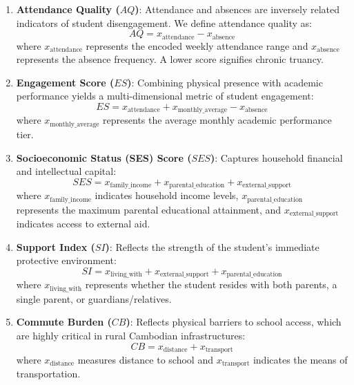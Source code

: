 \documentclass[12pt,journal,compsoc]{IEEEtran}
\begin{document}
\begin{enumerate}
    \item \textbf{Attendance Quality ($AQ$)}: Attendance and absences are inversely related indicators of student disengagement. We define attendance quality as:
    \begin{equation}
        AQ = x_{\text{attendance}} - x_{\text{absence}}
    \end{equation}
    where $x_{\text{attendance}}$ represents the encoded weekly attendance range and $x_{\text{absence}}$ represents the absence frequency. A lower score signifies chronic truancy.
    
    \item \textbf{Engagement Score ($ES$)}: Combining physical presence with academic performance yields a multi-dimensional metric of student engagement:
    \begin{equation}
        ES = x_{\text{attendance}} + x_{\text{monthly\_average}} - x_{\text{absence}}
    \end{equation}
    where $x_{\text{monthly\_average}}$ represents the average monthly academic performance tier.
    
    \item \textbf{Socioeconomic Status (SES) Score ($SES$)}: Captures household financial and intellectual capital:
    \begin{equation}
        SES = x_{\text{family\_income}} + x_{\text{parental\_education}} + x_{\text{external\_support}}
    \end{equation}
    where $x_{\text{family\_income}}$ indicates household income levels, $x_{\text{parental\_education}}$ represents the maximum parental educational attainment, and $x_{\text{external\_support}}$ indicates access to external aid.
    
    \item \textbf{Support Index ($SI$)}: Reflects the strength of the student's immediate protective environment:
    \begin{equation}
        SI = x_{\text{living\_with}} + x_{\text{external\_support}} + x_{\text{parental\_education}}
    \end{equation}
    where $x_{\text{living\_with}}$ represents whether the student resides with both parents, a single parent, or guardians/relatives.
    
    \item \textbf{Commute Burden ($CB$)}: Reflects physical barriers to school access, which are highly critical in rural Cambodian infrastructures:
    \begin{equation}
        CB = x_{\text{distance}} + x_{\text{transport}}
    \end{equation}
    where $x_{\text{distance}}$ measures distance to school and $x_{\text{transport}}$ indicates the means of transportation.
\end{enumerate}
\end{document}

